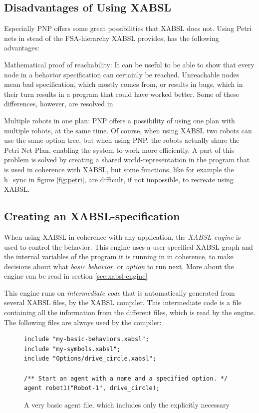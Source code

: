 \documentclass[a4paper,10pt]{article}
\begin{document}
\subsection{Disadvantages of Using XABSL}
Especially PNP offers some great possibilities that XABSL does not. Using Petri
nets in stead of the FSA-hierarchy XABSL provides, has the following advantages:
\begin{itemize*}
    \item Mathematical proof of reachability: It can be useful to be able to
    show that every node in a behavior specification can certainly be reached.
    Unreachable nodes mean bad specification, which mostly comes from, or
    results in bugs, which in their turn results in a program that could have
    worked better. Some of these differences, however, are resolved in
    \cite{alur1998model}
    \item Multiple robots in one plan: PNP offers a possibility of using one
    plan with multiple robots, at the same time. Of course, when using XABSL two
    robots can use the same option tree, but when using PNP, the robots actually
    share the Petri Net Plan, enabling the system to work more efficiently. A
    part of this problem is solved by creating a shared world-representation in
    the program that is used in coherence with XABSL, but some functions, like
    for example the h\_sync in figure \ref{fig:petri}, are difficult, if not
    impossible, to recreate using XABSL.
\end{itemize*}

\subsection{Creating an XABSL-specification}
When using XABSL in coherence with any application, the \textit{XABSL engine} is
used to control the behavior. This engine uses a user specified XABSL graph and
the internal variables of the program it is running in in coherence, to make
decisions about what \textit{basic behavior}, or \textit{option} to run next.
More about the engine can be read in section \ref{sec:xabsl-engine}

This engine runs on \textit{intermediate code} that is automatically generated
from several XABSL files, by the XABSL compiler. This intermediate code is a
file containing all the information from the different files, which is read by
the engine. The following files are always used by the compiler:
\begin{figure}
\centering
{}
\begin{lstlisting}
include "my-basic-behaviors.xabsl";
include "my-symbols.xabsl";
include "Options/drive_circle.xabsl";

/** Start an agent with a name and a specified option. */
agent robot1("Robot-1", drive_circle);
\end{lstlisting}
\caption{A very basic agent file, which includes only the explicitly
necessary}
\label{fig:agent}
\end{figure}
\end{document}
